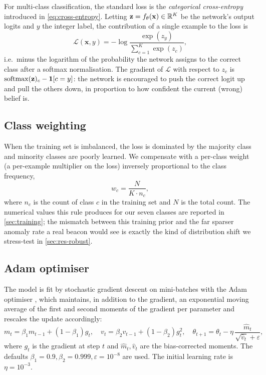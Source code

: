 For multi-class classification, the standard loss is the
\emph{categorical cross-entropy} introduced in \cref{eq:cross-entropy}.
Letting $\mathbf{z} = f_\theta(\mathbf{x}) \in \mathbb{R}^K$ be the network's
output logits and $y$ the integer label, the contribution of a single
example to the loss is
\begin{equation}
    \mathcal{L}(\mathbf{x}, y) = -\log \frac{\exp(z_y)}{\sum_{c=1}^{K} \exp(z_c)},
\end{equation}
i.e.\ minus the logarithm of the probability the network assigns to the
correct class after a softmax normalisation. The gradient of $\mathcal{L}$
with respect to $z_c$ is $\operatorname{softmax}(\mathbf{z})_c - \mathbf{1}[c=y]$:
the network is encouraged to push the correct logit up and pull the
others down, in proportion to how confident the current (wrong) belief
is.

\subsection{Class weighting}
\label{sec:cw-theory}

When the training set is imbalanced, the loss is dominated by the
majority class and minority classes are poorly learned. We compensate
with a per-class weight (a per-example multiplier on the loss)
inversely proportional to the class frequency,
\begin{equation}
    w_c = \frac{N}{K \cdot n_c},
\end{equation}
where $n_c$ is the count of class $c$ in the training set and $N$ is
the total count. The numerical values this rule produces for our seven
classes are reported in \cref{sec:training}; the mismatch between this
training prior and the far sparser anomaly rate a real beacon would see
is exactly the kind of distribution shift we stress-test in
\cref{sec:res-robust}.

\subsection{Adam optimiser}
\label{sec:adam-theory}

The model is fit by stochastic gradient descent on mini-batches with
the Adam optimiser \cite{kingma2015adam}, which maintains, in addition
to the gradient, an exponential moving average of the first and second
moments of the gradient per parameter and rescales the update
accordingly:
\begin{equation}
    m_t = \beta_1 m_{t-1} + (1 - \beta_1) g_t,
    \quad
    v_t = \beta_2 v_{t-1} + (1 - \beta_2) g_t^2,
    \quad
    \theta_{t+1} = \theta_t - \eta \, \frac{\hat{m}_t}{\sqrt{\hat{v}_t} + \varepsilon},
\end{equation}
where $g_t$ is the gradient at step $t$ and $\hat{m}_t, \hat{v}_t$ are
the bias-corrected moments. The defaults $\beta_1=0.9, \beta_2=0.999,
\varepsilon=10^{-8}$ are used. The initial learning rate is $\eta=10^{-3}$.

